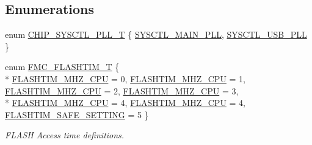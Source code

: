\subsection*{Enumerations}
\begin{DoxyCompactItemize}
\item 
enum \hyperlink{group___s_y_s_c_t_l__17_x_x__40_x_x_ga5f5478a201b021ed04a0724bff524c4b}{C\+H\+I\+P\+\_\+\+S\+Y\+S\+C\+T\+L\+\_\+\+P\+L\+L\+\_\+\+T} \{ \hyperlink{group___s_y_s_c_t_l__17_x_x__40_x_x_gga5f5478a201b021ed04a0724bff524c4bad3626cb96bb7a84a9bce324812044d21}{S\+Y\+S\+C\+T\+L\+\_\+\+M\+A\+I\+N\+\_\+\+P\+L\+L}, 
\hyperlink{group___s_y_s_c_t_l__17_x_x__40_x_x_gga5f5478a201b021ed04a0724bff524c4ba5ee38509163556b883664d7259c43dfd}{S\+Y\+S\+C\+T\+L\+\_\+\+U\+S\+B\+\_\+\+P\+L\+L}
 \}
\item 
enum \hyperlink{group___s_y_s_c_t_l__17_x_x__40_x_x_ga0779e088e3fa7b3a18e66fa0949da8a7}{F\+M\+C\+\_\+\+F\+L\+A\+S\+H\+T\+I\+M\+\_\+\+T} \{ \\*
\hyperlink{group___s_y_s_c_t_l__17_x_x__40_x_x_gga0779e088e3fa7b3a18e66fa0949da8a7aeb017487ff6fd051dfc885ba063415a3}{F\+L\+A\+S\+H\+T\+I\+M\+\_\+M\+H\+Z\+\_\+\+C\+P\+U} = 0, 
\hyperlink{group___s_y_s_c_t_l__17_x_x__40_x_x_gga0779e088e3fa7b3a18e66fa0949da8a7a617391e132f72d731806d6af10863407}{F\+L\+A\+S\+H\+T\+I\+M\+\_\+M\+H\+Z\+\_\+\+C\+P\+U} = 1, 
\hyperlink{group___s_y_s_c_t_l__17_x_x__40_x_x_gga0779e088e3fa7b3a18e66fa0949da8a7af482ee6a465905fd232ff2da7f993514}{F\+L\+A\+S\+H\+T\+I\+M\+\_\+M\+H\+Z\+\_\+\+C\+P\+U} = 2, 
\hyperlink{group___s_y_s_c_t_l__17_x_x__40_x_x_gga0779e088e3fa7b3a18e66fa0949da8a7aff2c5410ad123adc43eb1a781f71ffe8}{F\+L\+A\+S\+H\+T\+I\+M\+\_\+M\+H\+Z\+\_\+\+C\+P\+U} = 3, 
\\*
\hyperlink{group___s_y_s_c_t_l__17_x_x__40_x_x_gga0779e088e3fa7b3a18e66fa0949da8a7af386ac4dceedf99032479736a40c7257}{F\+L\+A\+S\+H\+T\+I\+M\+\_\+M\+H\+Z\+\_\+\+C\+P\+U} = 4, 
\hyperlink{group___s_y_s_c_t_l__17_x_x__40_x_x_gga0779e088e3fa7b3a18e66fa0949da8a7a747d8440c3924f3546bbb895b101e085}{F\+L\+A\+S\+H\+T\+I\+M\+\_\+M\+H\+Z\+\_\+\+C\+P\+U} = 4, 
\hyperlink{group___s_y_s_c_t_l__17_x_x__40_x_x_gga0779e088e3fa7b3a18e66fa0949da8a7a769f5cbe41f1f487aeaf3ca300be86fb}{F\+L\+A\+S\+H\+T\+I\+M\+\_\+\+S\+A\+F\+E\+\_\+\+S\+E\+T\+T\+I\+N\+G} = 5
 \}
\begin{DoxyCompactList}\small\item\em F\+L\+A\+S\+H Access time definitions. \end{DoxyCompactList}\item 

\end{DoxyCompactItemize}
